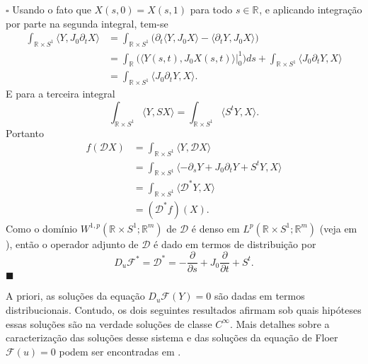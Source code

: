 \documentclass[12pt]{book}
\newenvironment{prova}[1]{$\square$ #1}{\hfill$\blacksquare$}
\newcommand{\bigparenteses}[1]{\Big( #1 \Big) }
\newcommand{\circulo}{S^{1}}
\newcommand{\diferencialfloerponto}[1]{D_{#1}\operadorFloer}
\newcommand{\diferencialfloeradjponto}[1]{D_{#1}\operadorFloer^{*}}
\newcommand{\diferencialfloerabrev}{\mathcal{D}}
\newcommand{\derivadaparcial}[2]{\frac{\partial #1}{\partial #2}}
\newcommand{\derivadaparcialabrev}[1]{\partial_{#1}}
\newcommand{\espacoLpcontradominio}[2]{L^{p}(#1;#2)}
\newcommand{\espacosobolevcontradominio}[2]{W^{1,p}(#1;#2)}
\newcommand{\estruturacomplexa}{J_{0}}
\newcommand{\operadorFloer}{\mathcal{F}}
\newcommand{\operadorFloerParametro}[1]{\mathcal{F}(#1)}
\newcommand{\produtointerno}[2]{\langle #1, #2 \rangle}
\newcommand{\retacartesianocirculo}{\real{} \times \circulo}
\newcommand{\real}[1]{\mathbb{R}^{#1}}
\newcommand{\reta}{\real{}}
\begin{document}
\begin{prova}
		Usando o fato que $X(s, 0)=X(s, 1)$ para todo $s\in \reta$, e aplicando integração por parte na segunda integral, tem-se
		$$
		\begin{aligned}
		\int_{\retacartesianocirculo}\produtointerno{Y}{\estruturacomplexa\derivadaparcialabrev{ t}X} 
		&= \int_{\retacartesianocirculo}\bigparenteses{\derivadaparcialabrev{t}\produtointerno{Y}{ \estruturacomplexa X}-\produtointerno{\derivadaparcialabrev{t}Y }{\estruturacomplexa X}}
		\\
		&= \int_{\reta}\bigparenteses{\produtointerno{Y(s,t)}{\estruturacomplexa X(s,t)}\Big|_{0}^{1}}ds + \int_{\retacartesianocirculo}\produtointerno{\estruturacomplexa \derivadaparcialabrev{t}Y}{ X}
		\\
		&=\int_{\retacartesianocirculo}\produtointerno{\estruturacomplexa \derivadaparcialabrev{t}Y}{ X}.
		\end{aligned}
		$$
		E para a terceira integral
		$$
		\int_{\retacartesianocirculo}\produtointerno{Y}{S X}= \int_{\retacartesianocirculo}\produtointerno{S^{t}Y}{ X}.
		$$
		Portanto
		$$
		\begin{aligned}
		f(\diferencialfloerabrev X)
		&= \int_{\retacartesianocirculo}\produtointerno{Y}{\diferencialfloerabrev X}
		\\
		&=
		\int_{\retacartesianocirculo}\produtointerno{-\derivadaparcialabrev{s}Y+\estruturacomplexa \derivadaparcialabrev{t}Y + S^{t}Y}{ X}
		\\
		&=\int_{\retacartesianocirculo}\produtointerno{\diferencialfloerabrev^{*}Y}{ X}
		\\
		&=(\diferencialfloerabrev^{*}f)(X).
		\end{aligned}
		$$
		Como o domínio $\espacosobolevcontradominio{\retacartesianocirculo}{\real{m}} $ de $\diferencialfloerabrev$ é denso em $\espacoLpcontradominio{\retacartesianocirculo}{\real{m}}$ (veja em \cite{breazis_sobolev_spaces}), então o operador adjunto de $\diferencialfloerabrev$ é dado em termos de distribuição por
		$$
		\diferencialfloeradjponto{u}=\diferencialfloerabrev^{*}=-\derivadaparcial{}{s}+\estruturacomplexa \derivadaparcial{}{t}+S^{t}.
		$$
	\end{prova}
	
	A priori, as soluções da equação $\diferencialfloerponto{u}(Y)=0$ são dadas em termos distribucionais. Contudo, os dois seguintes resultados afirmam sob quais hipóteses essas soluções são na verdade soluções de classe $C^{\infty}$. Mais detalhes sobre a caracterização das soluções desse sistema e das soluções da equação de Floer $\operadorFloerParametro{u}=0$ podem ser encontradas em \cite{audi_floer_homology}.
	
\end{document}
